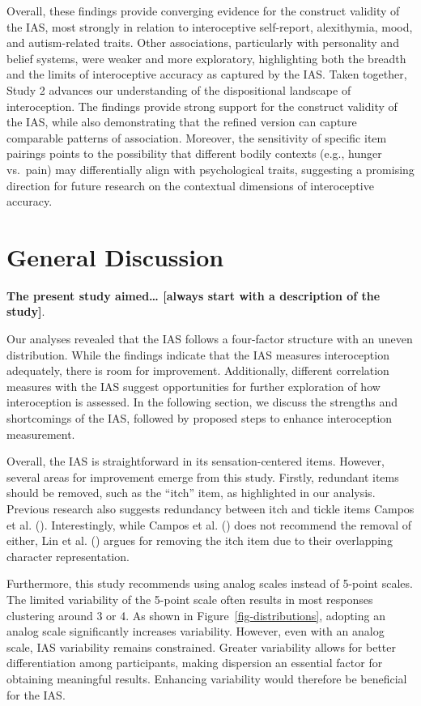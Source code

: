 \documentclass[
  jou,
  floatsintext,
  longtable,
  nolmodern,
  notxfonts,
  notimes,
  colorlinks=true,linkcolor=blue,citecolor=blue,urlcolor=blue]{apa7}
\begin{document}
Overall, these findings provide converging evidence for the construct
validity of the IAS, most strongly in relation to interoceptive
self-report, alexithymia, mood, and autism-related traits. Other
associations, particularly with personality and belief systems, were
weaker and more exploratory, highlighting both the breadth and the
limits of interoceptive accuracy as captured by the IAS. Taken together,
Study 2 advances our understanding of the dispositional landscape of
interoception. The findings provide strong support for the construct
validity of the IAS, while also demonstrating that the refined version
can capture comparable patterns of association. Moreover, the
sensitivity of specific item pairings points to the possibility that
different bodily contexts (e.g., hunger vs.~pain) may differentially
align with psychological traits, suggesting a promising direction for
future research on the contextual dimensions of interoceptive accuracy.

\section{General Discussion}\label{general-discussion}

\textbf{The present study aimed\ldots{} {[}always start with a
description of the study{]}}.

Our analyses revealed that the IAS follows a four-factor structure with
an uneven distribution. While the findings indicate that the IAS
measures interoception adequately, there is room for improvement.
Additionally, different correlation measures with the IAS suggest
opportunities for further exploration of how interoception is assessed.
In the following section, we discuss the strengths and shortcomings of
the IAS, followed by proposed steps to enhance interoception
measurement.

Overall, the IAS is straightforward in its sensation-centered items.
However, several areas for improvement emerge from this study. Firstly,
redundant items should be removed, such as the ``itch'' item, as
highlighted in our analysis. Previous research also suggests redundancy
between itch and tickle items Campos et al.
(). Interestingly, while Campos et al.
() does not recommend the removal of
either, Lin et al. () argues for removing
the itch item due to their overlapping character representation.

Furthermore, this study recommends using analog scales instead of
5-point scales. The limited variability of the 5-point scale often
results in most responses clustering around 3 or 4. As shown in
Figure~\ref{fig-distributions}, adopting an analog scale significantly
increases variability. However, even with an analog scale, IAS
variability remains constrained. Greater variability allows for better
differentiation among participants, making dispersion an essential
factor for obtaining meaningful results. Enhancing variability would
therefore be beneficial for the IAS.
\end{document}
